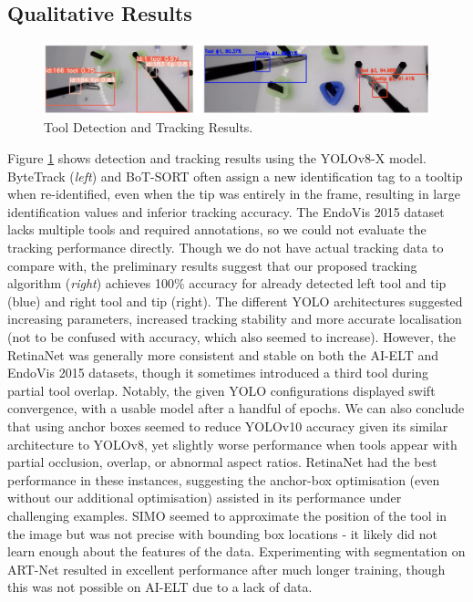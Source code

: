\normalsize

\subsection{Qualitative Results}

\begin{figure}[htbp]
    \centering
    \vspace*{-3mm}
    \includegraphics[width=1\linewidth]{test5_results.png}
    \vspace*{-7.5mm}
    \caption{Tool Detection and Tracking Results.}
    \vspace*{-2.5mm}
    \label{fig:test5_results}
\end{figure}

Figure \ref{fig:test5_results} shows detection and tracking results using the YOLOv8-X model. ByteTrack (\textit{left}) and BoT-SORT often assign a new identification tag to a tooltip when re-identified, even when the tip was entirely in the frame, resulting in large identification values and inferior tracking accuracy. The EndoVis 2015 dataset lacks multiple tools and required annotations, so we could not evaluate the tracking performance directly. Though we do not have actual tracking data to compare with, the preliminary results suggest that our proposed tracking algorithm (\textit{right}) achieves 100\% accuracy for already detected left tool and tip (blue) and right tool and tip (right). The different YOLO architectures suggested increasing parameters, increased tracking stability and more accurate localisation (not to be confused with accuracy, which also seemed to increase). However, the RetinaNet was generally more consistent and stable on both the AI-ELT and EndoVis 2015 datasets, though it sometimes introduced a third tool during partial tool overlap. Notably, the given YOLO configurations displayed swift convergence, with a usable model after a handful of epochs. We can also conclude that using anchor boxes seemed to reduce YOLOv10 accuracy given its similar architecture to YOLOv8, yet slightly worse performance when tools appear with partial occlusion, overlap, or abnormal aspect ratios. RetinaNet had the best performance in these instances, suggesting the anchor-box optimisation (even without our additional optimisation) assisted in its performance under challenging examples. SIMO seemed to approximate the position of the tool in the image but was not precise with bounding box locations - it likely did not learn enough about the features of the data. Experimenting with segmentation on ART-Net resulted in excellent performance after much longer training, though this was not possible on AI-ELT due to a lack of data.

